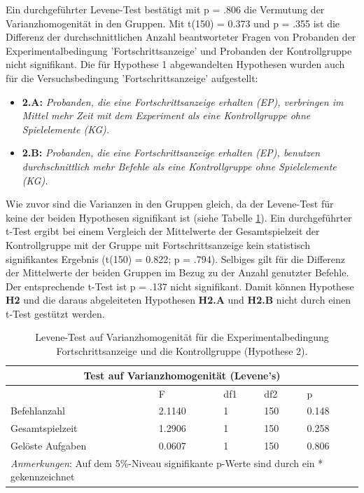 Ein durchgeführter Levene-Test bestätigt mit p = .806 die Vermutung der Varianzhomogenität in den Gruppen. Mit t(150) = 0.373 und p = .355 ist die Differenz der durchschnittlichen Anzahl beantworteter Fragen von Probanden der Experimentalbedingung 'Fortschrittsanzeige' und Probanden der Kontrollgruppe nicht signifikant. Die für Hypothese 1 abgewandelten Hypothesen wurden auch für die Versuchsbedingung 'Fortschrittsanzeige' aufgestellt: 

\begin{itemize}
    \item \textbf{2.A:} \textit{Probanden, die eine Fortschrittsanzeige erhalten (EP), verbringen im Mittel mehr Zeit mit dem Experiment als eine Kontrollgruppe ohne Spielelemente (KG).}
    \item \textbf{2.B:} \textit{Probanden, die eine Fortschrittsanzeige erhalten (EP), benutzen durchschnittlich mehr Befehle als eine Kontrollgruppe ohne Spielelemente (KG).} 
\end{itemize}

 Wie zuvor sind die Varianzen in den Gruppen gleich, da der Levene-Test für keine der beiden Hypothesen signifikant ist (siehe Tabelle \ref{levene_hypo_2}). Ein durchgeführter t-Test ergibt bei einem Vergleich  der  Mittelwerte  der Gesamtspielzeit der Kontrollgruppe mit der Gruppe mit Fortschrittsanzeige kein statistisch signifikantes Ergebnis (t(150) = 0.822; p = .794). Selbiges gilt für die Differenz der Mittelwerte der beiden Gruppen im Bezug zu der Anzahl genutzter Befehle. Der entsprechende t-Test ist p = .137 nicht signifikant. Damit können Hypothese \textbf{H2} und die daraus abgeleiteten Hypothesen \textbf{H2.A} und \textbf{H2.B} nicht durch einen t-Test gestützt werden.


\begin{table}[htbp]
\centering
\caption{Levene-Test auf Varianzhomogenität für die Experimentalbedingung Fortschrittsanzeige und die Kontrollgruppe (Hypothese 2).}
\begin{tabular}{ |p{4cm}||p{2.0cm}|p{2.0cm}|p{2.0cm}|p{2.0cm}| }
 \hline
 \multicolumn{5}{|c|}{Test auf Varianzhomogenität (Levene's)} \\
 \hline
 & F & df1 &df2 &p \\
 \hline
  Befehlanzahl      & 2.1140     & 1 &   150 & 0.148\\
  Gesamtspielzeit   & 1.2906     & 1 &   150 & 0.258\\
  Gelöste Aufgaben  & 0.0607     & 1 &   150 & 0.806\\
 \hline
  \multicolumn{5}{l}{%
 \small%
\textit{Anmerkungen}: Auf dem 5\%-Niveau signifikante p-Werte sind durch ein * gekennzeichnet
}\\
\end{tabular}
\label{levene_hypo_2}
\end{table}

